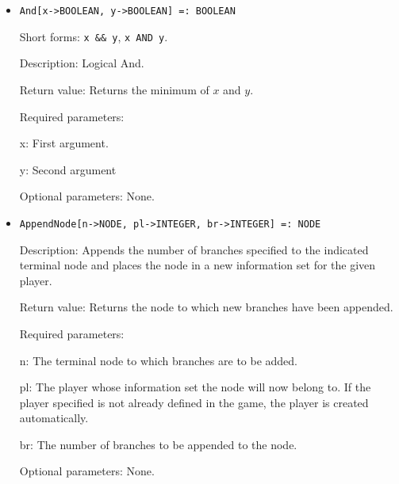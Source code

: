 \begin{itemize}


\item 
\protect \large \begin{verbatim}
And[x->BOOLEAN, y->BOOLEAN] =: BOOLEAN
\end{verbatim} \normalsize
  
\bd
\item
[Short forms:] \verb+x && y+, \verb+x AND y+.
\item
[Description:] Logical And.
\item
[Return value:] Returns the minimum of $x$ and $y$.  
\item
[Required parameters:]\hfil\null
\bd
\item
[x:] First argument.  
\item
[y:] Second argument
\ed
\item
[Optional parameters:] None.
\ed

\item
\protect \large \begin{verbatim}
AppendNode[n->NODE, pl->INTEGER, br->INTEGER] =: NODE
\end{verbatim} \normalsize

\bd
\item
[Description:] Appends the number of branches specified to the
indicated terminal node and places the node in a new information set
for the given player.
\item
[Return value:] Returns the node to which new branches have been
appended.
\item
[Required parameters:]\hfil\null
\par
\bd
\item
[n:] The terminal node to which branches are to be added.
\item
[pl:] The player whose information set the node will now belong to.
If the player specified is not already defined in the game, the player
is created automatically.
\item
[br:] The number of branches to be appended to the node.
\ed

\item
[Optional parameters:] None.
\ed


\end{itemize}

